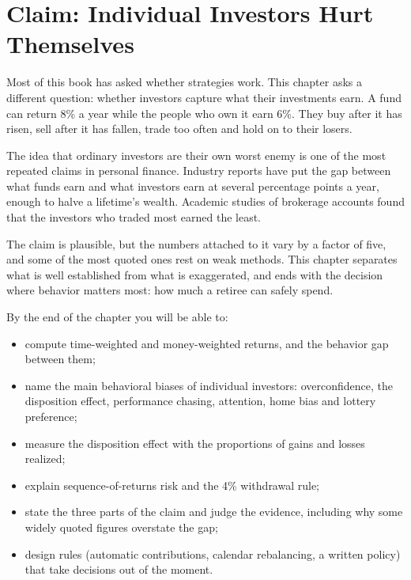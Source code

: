 \makeatletter
{}
\makeatother

\chapter{Claim: Individual Investors Hurt Themselves}
\label{ch:24}

Most of this book has asked whether strategies work. This chapter asks a different question: whether investors capture what their investments earn. A fund can return 8\% a year while the people who own it earn 6\%. They buy after it has risen, sell after it has fallen, trade too often and hold on to their losers.

The idea that ordinary investors are their own worst enemy is one of the most repeated claims in personal finance. Industry reports have put the gap between what funds earn and what investors earn at several percentage points a year, enough to halve a lifetime's wealth. Academic studies of brokerage accounts found that the investors who traded most earned the least.

The claim is plausible, but the numbers attached to it vary by a factor of five, and some of the most quoted ones rest on weak methods. This chapter separates what is well established from what is exaggerated, and ends with the decision where behavior matters most: how much a retiree can safely spend.

By the end of the chapter you will be able to:

\begin{itemize}
  \item compute time-weighted and money-weighted returns, and the behavior gap between them;
  \item name the main behavioral biases of individual investors: overconfidence, the disposition effect, performance chasing, attention, home bias and lottery preference;
  \item measure the disposition effect with the proportions of gains and losses realized;
  \item explain sequence-of-returns risk and the 4\% withdrawal rule;
  \item state the three parts of the claim and judge the evidence, including why some widely quoted figures overstate the gap;
  \item design rules (automatic contributions, calendar rebalancing, a written policy) that take decisions out of the moment.
\end{itemize}

